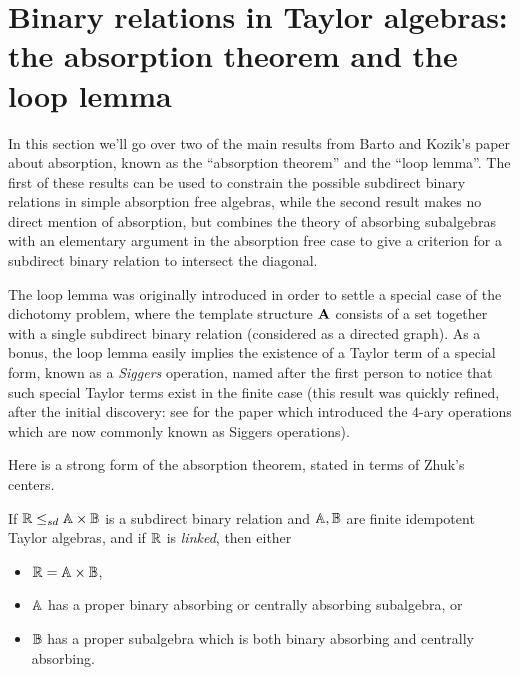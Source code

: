 \documentclass[letterpaper,11pt]{article}
\begin{document}



\section{Binary relations in Taylor algebras: the absorption theorem and the loop lemma}

In this section we'll go over two of the main results from Barto and Kozik's paper \cite{cyclic} about absorption, known as the ``absorption theorem'' and the ``loop lemma''. The first of these results can be used to constrain the possible subdirect binary relations in simple absorption free algebras, while the second result makes no direct mention of absorption, but combines the theory of absorbing subalgebras with an elementary argument in the absorption free case to give a criterion for a subdirect binary relation to intersect the diagonal.

The loop lemma was originally introduced in order to settle a special case of the dichotomy problem, where the template structure $\mathbf{A}$ consists of a set together with a single subdirect binary relation (considered as a directed graph). As a bonus, the loop lemma easily implies the existence of a Taylor term of a special form, known as a \emph{Siggers} operation, named after the first person to notice that such special Taylor terms exist in the finite case \cite{siggers-original} (this result was quickly refined, after the initial discovery: see \cite{optimal-taylor} for the paper which introduced the $4$-ary operations which are now commonly known as Siggers operations).

Here is a strong form of the absorption theorem, stated in terms of Zhuk's centers.

\begin{thm}\label{absorption-theorem} If $\mathbb{R} \le_{sd} \mathbb{A} \times \mathbb{B}$ is a subdirect binary relation and $\mathbb{A},\mathbb{B}$ are finite idempotent Taylor algebras, and if $\mathbb{R}$ is \emph{linked}, then either
\begin{itemize}
\item $\mathbb{R} = \mathbb{A} \times \mathbb{B}$,
\item $\mathbb{A}$ has a proper binary absorbing or centrally absorbing subalgebra, or
\item $\mathbb{B}$ has a proper subalgebra which is both binary absorbing and centrally absorbing.
\end{itemize}
\end{thm}
\end{document}

